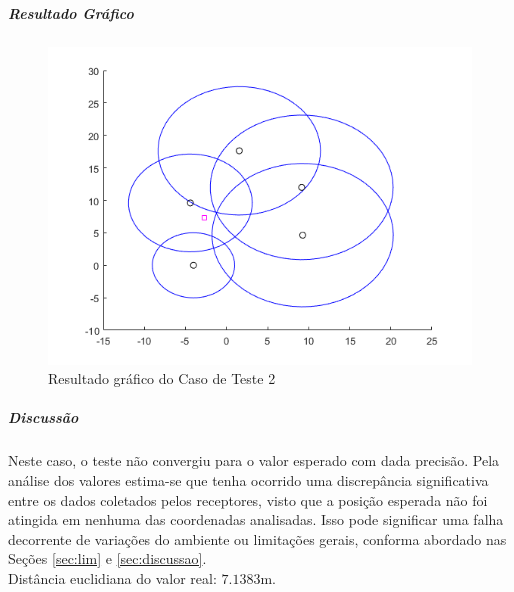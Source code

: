 	\subparagraph{Resultado Gráfico}
	\begin{figure}[h]
		\centering
		\includegraphics[scale = 0.7]{ct_2}
		\caption{Resultado gráfico do Caso de Teste 2}
	\end{figure}

	\subparagraph{Discussão}
	Neste caso, o teste não convergiu para o valor esperado com dada precisão. Pela
	análise dos valores estima-se que tenha ocorrido uma discrepância significativa
	entre os dados coletados pelos receptores, visto que a posição esperada não foi
	atingida em nenhuma das coordenadas analisadas. Isso pode significar uma falha
	decorrente de variações do ambiente ou limitações gerais, conforma abordado nas
	Seções \ref{sec:lim} e \ref{sec:discussao}.\\
	Distância euclidiana do valor real: $7.1383$m.

	
	

